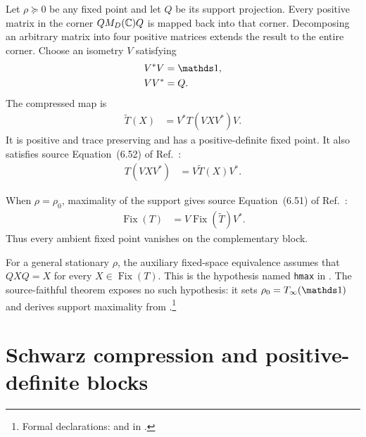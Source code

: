 \documentclass{article}
\begin{document}
Let $\rho\succeq0$ be any fixed point and let $Q$ be its support projection.
Every positive matrix in the corner $QM_{D}(\mathbb{C})Q$ is mapped back into that corner.
Decomposing an arbitrary matrix into four positive matrices extends the result
to the entire corner. Choose an isometry $V$ satisfying
\begin{align}
  V^*V
    &=\Id,
  \label{eq:wolf_theorem6_14_fixed_point_projection_gap_isometry_initial}\\
  VV^*
    &=Q.
  \label{eq:wolf_theorem6_14_fixed_point_projection_gap_isometry_range}
\end{align}
The compressed map is
\begin{align}
  \widetilde T(X)
    &=V^*T(VXV^*)V.
  \label{eq:wolf_theorem6_14_fixed_point_projection_gap_compressed_map}
\end{align}
It is positive and trace preserving and has a positive-definite fixed point.
It also satisfies source Equation~(6.52) of Ref.~\cite{Wolf2012Quantum}:
\begin{align}
  T(VXV^*)
    &=V\widetilde T(X)V^*.
  \label{eq:wolf_theorem6_14_fixed_point_projection_gap_compression_intertwining}
\end{align}

When $\rho=\rho_0$, maximality of the support gives source Equation~(6.51) of Ref.~\cite{Wolf2012Quantum}:
\begin{align}
  \operatorname{Fix}(T)
    &=V\operatorname{Fix}(\widetilde T)V^*.
  \label{eq:wolf_theorem6_14_fixed_point_projection_gap_compressed_fixed_space}
\end{align}
Thus every ambient fixed point vanishes on the complementary block.

For a general stationary $\rho$, the auxiliary fixed-space equivalence assumes
that $QXQ=X$ for every $X\in\operatorname{Fix}(T)$. This is the hypothesis
named \texttt{hmax} in
.
The source-faithful theorem
 exposes no such
hypothesis: it sets $\rho_0=T_\infty(\Id)$ and derives support maximality from
.\footnote{Formal
declarations:
 and
in
.}

\section{Schwarz compression and positive-definite blocks}
\end{document}
